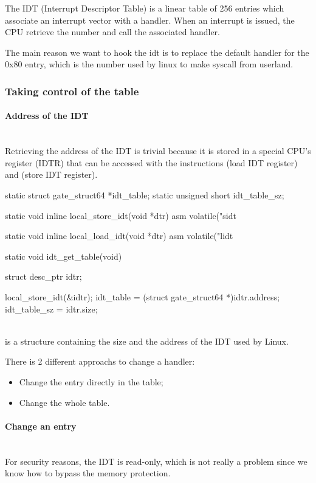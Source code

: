 The IDT (Interrupt Descriptor Table) is a linear table of 256 entries which
associate an interrupt vector with a handler. When an interrupt is issued,
the CPU retrieve the number and call the associated handler.

The main reason we want to hook the idt is to replace the default handler for
the 0x80 entry, which is the number used by linux to make syscall from
userland.

\subsubsection{Taking control of the table}
\paragraph{Address of the IDT}\mbox{}\\
Retrieving the address of the IDT is trivial because it is stored in a
special CPU's register (IDTR) that can be accessed with the instructions
 (load IDT register) and  (store IDT register).

\begin{ccode}
static struct gate_struct64 *idt_table;
static unsigned short idt_table_sz;

static void inline local_store_idt(void *dtr) {
    asm volatile("sidt %
}

static void inline local_load_idt(void *dtr) {
    asm volatile("lidt %
}

static void idt_get_table(void) {
    struct desc_ptr idtr;

    local_store_idt(&idtr);
    idt_table = (struct gate_struct64 *)idtr.address;
    idt_table_sz = idtr.size;
}
\end{ccode}\\
 is a structure containing the size and the address of the
IDT used by Linux.


There is 2 different approachs to change a handler:
\begin{itemize}
    \item Change the entry directly in the table;
    \item Change the whole table.
\end{itemize}

\paragraph{Change an entry}\mbox{}\\
For security reasons, the IDT is read-only, which is not really a problem
since we know how to bypass the memory protection.


